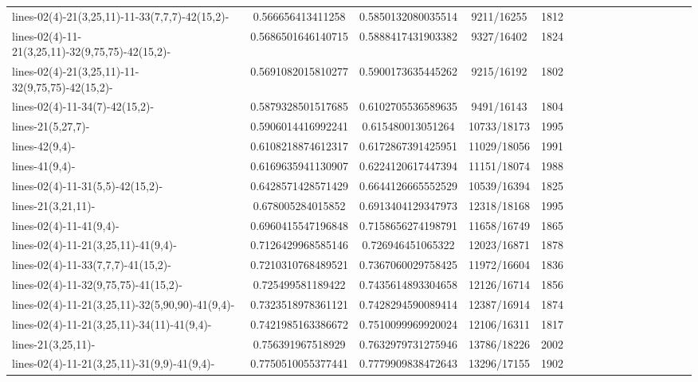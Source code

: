 \documentclass[12pt,oneside]{report}			%
\begin{document}
\begin{landscape}
\begin{longtable}{ | p{5cm} | *{15}{c|}}
lines-02(4)-21(3,25,11)-11-33(7,7,7)-42(15,2)-   & 0.566656413411258   & 0.5850132080035514  & 9211/16255  & 1812 \\
lines-02(4)-11-21(3,25,11)-32(9,75,75)-42(15,2)-  & 0.5686501646140715  & 0.5888417431903382  & 9327/16402  & 1824 \\
lines-02(4)-21(3,25,11)-11-32(9,75,75)-42(15,2)-  & 0.5691082015810277  & 0.5900173635445262  & 9215/16192  & 1802 \\
lines-02(4)-11-34(7)-42(15,2)-                    & 0.5879328501517685  & 0.6102705536589635  & 9491/16143  & 1804 \\
lines-21(5,27,7)-                                 & 0.5906014416992241  & 0.615480013051264   & 10733/18173 & 1995 \\
lines-42(9,4)-                                    & 0.6108218874612317  & 0.6172867391425951  & 11029/18056 & 1991 \\
lines-41(9,4)-                                    & 0.6169635941130907  & 0.6224120617447394  & 11151/18074 & 1988 \\
lines-02(4)-11-31(5,5)-42(15,2)-                  & 0.6428571428571429  & 0.6644126665552529  & 10539/16394 & 1825 \\
lines-21(3,21,11)-                                & 0.678005284015852   & 0.6913404129347973  & 12318/18168 & 1995 \\
lines-02(4)-11-41(9,4)-                           & 0.6960415547196848  & 0.7158656274198791  & 11658/16749 & 1865 \\
lines-02(4)-11-21(3,25,11)-41(9,4)-               & 0.7126429968585146  & 0.726946451065322   & 12023/16871 & 1878 \\
lines-02(4)-11-33(7,7,7)-41(15,2)-               & 0.7210310768489521  & 0.7367060029758425  & 11972/16604 & 1836 \\
lines-02(4)-11-32(9,75,75)-41(15,2)-              & 0.725499581189422   & 0.7435614893304658  & 12126/16714 & 1856 \\
lines-02(4)-11-21(3,25,11)-32(5,90,90)-41(9,4)-   & 0.7323518978361121  & 0.7428294590089414  & 12387/16914 & 1874 \\
lines-02(4)-11-21(3,25,11)-34(11)-41(9,4)-        & 0.7421985163386672  & 0.7510099969920024  & 12106/16311 & 1817 \\
lines-21(3,25,11)-                                & 0.756391967518929   & 0.7632979731275946  & 13786/18226 & 2002 \\
lines-02(4)-11-21(3,25,11)-31(9,9)-41(9,4)-       & 0.7750510055377441  & 0.7779909838472643  & 13296/17155 & 1902 \\

\end{longtable}
\end{landscape}
\end{document}
